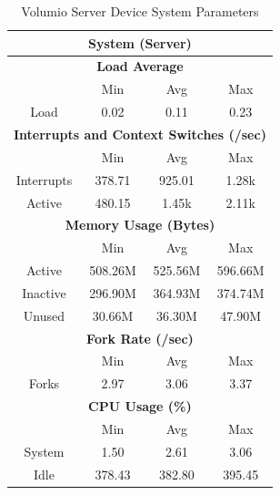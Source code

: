 \documentclass[11pt,a4paper,headinclude=false,footinclude=false]{scrreprt}
\begin{document}
\begin{table}[H]
\centering
    \begin{tabular}{||c|c|c|c|c|c|c||}
    \hline
    \multicolumn{7}{|c|}{\textbf{System (Server)}} \\
    \hline
    \multicolumn{7}{|c|}{\textbf{Load Average}} \\
    \hline\hline
      & \multicolumn{2}{|c|}{Min} & \multicolumn{2}{|c|}{Avg} & \multicolumn{2}{|c|}{Max} \\
    \hline
    Load & \multicolumn{2}{|c|}{0.02} & \multicolumn{2}{|c|}{0.11} & \multicolumn{2}{|c|}{0.23} \\
    \hline\hline
    \multicolumn{7}{|c|}{\textbf{Interrupts and Context Switches (/sec)}} \\
    \hline
      & \multicolumn{2}{|c|}{Min} & \multicolumn{2}{|c|}{Avg} & \multicolumn{2}{|c|}{Max} \\
    \hline
    Interrupts & \multicolumn{2}{|c|}{378.71} & \multicolumn{2}{|c|}{925.01} & \multicolumn{2}{|c|}{1.28k} \\
    \hline
    Active & \multicolumn{2}{|c|}{480.15} & \multicolumn{2}{|c|}{1.45k} & \multicolumn{2}{|c|}{2.11k} \\
    \hline\hline
    \multicolumn{7}{|c|}{\textbf{Memory Usage (Bytes)}} \\
    \hline\hline
      & \multicolumn{2}{|c|}{Min} & \multicolumn{2}{|c|}{Avg} & \multicolumn{2}{|c|}{Max} \\
    \hline
    Active & \multicolumn{2}{|c|}{508.26M} & \multicolumn{2}{|c|}{525.56M} & \multicolumn{2}{|c|}{596.66M} \\
    \hline
    Inactive & \multicolumn{2}{|c|}{296.90M} & \multicolumn{2}{|c|}{364.93M} & \multicolumn{2}{|c|}{374.74M} \\
    \hline
    Unused & \multicolumn{2}{|c|}{30.66M} & \multicolumn{2}{|c|}{36.30M} & \multicolumn{2}{|c|}{47.90M} \\
    \hline\hline
    \multicolumn{7}{|c|}{\textbf{Fork Rate (/sec)}} \\
    \hline\hline
      & \multicolumn{2}{|c|}{Min} & \multicolumn{2}{|c|}{Avg} & \multicolumn{2}{|c|}{Max} \\
    \hline
    Forks & \multicolumn{2}{|c|}{2.97} & \multicolumn{2}{|c|}{3.06} & \multicolumn{2}{|c|}{3.37} \\
    \hline\hline
    \multicolumn{7}{|c|}{\textbf{CPU Usage (\%)}} \\
    \hline\hline
      & \multicolumn{2}{|c|}{Min} & \multicolumn{2}{|c|}{Avg} & \multicolumn{2}{|c|}{Max} \\
    \hline
    System & \multicolumn{2}{|c|}{1.50} & \multicolumn{2}{|c|}{2.61} & \multicolumn{2}{|c|}{3.06} \\
    \hline
    Idle & \multicolumn{2}{|c|}{378.43} & \multicolumn{2}{|c|}{382.80} & \multicolumn{2}{|c|}{395.45} \\
    \hline\hline
    \end{tabular}
    \caption{Volumio Server Device System Parameters}
    \label{VolumioserverSysTab}
\end{table}
\end{document}
